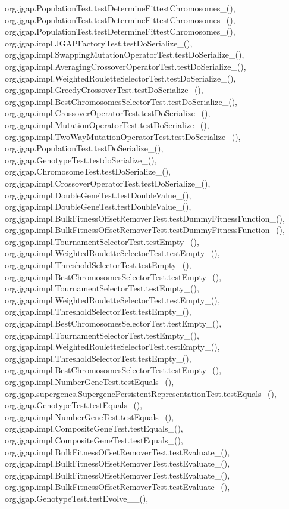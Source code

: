 org.\-jgap.\-Population\-Test.\-test\-Determine\-Fittest\-Chromosomes\-\_(), org.\-jgap.\-Population\-Test.\-test\-Determine\-Fittest\-Chromosomes\-\_(), org.\-jgap.\-Population\-Test.\-test\-Determine\-Fittest\-Chromosomes\-\_(), org.\-jgap.\-impl.\-J\-G\-A\-P\-Factory\-Test.\-test\-Do\-Serialize\-\_(), org.\-jgap.\-impl.\-Swapping\-Mutation\-Operator\-Test.\-test\-Do\-Serialize\-\_(), org.\-jgap.\-impl.\-Averaging\-Crossover\-Operator\-Test.\-test\-Do\-Serialize\-\_(), org.\-jgap.\-impl.\-Weighted\-Roulette\-Selector\-Test.\-test\-Do\-Serialize\-\_(), org.\-jgap.\-impl.\-Greedy\-Crossover\-Test.\-test\-Do\-Serialize\-\_(), org.\-jgap.\-impl.\-Best\-Chromosomes\-Selector\-Test.\-test\-Do\-Serialize\-\_(), org.\-jgap.\-impl.\-Crossover\-Operator\-Test.\-test\-Do\-Serialize\-\_(), org.\-jgap.\-impl.\-Mutation\-Operator\-Test.\-test\-Do\-Serialize\-\_(), org.\-jgap.\-impl.\-Two\-Way\-Mutation\-Operator\-Test.\-test\-Do\-Serialize\-\_(), org.\-jgap.\-Population\-Test.\-test\-Do\-Serialize\-\_(), org.\-jgap.\-Genotype\-Test.\-testdo\-Serialize\-\_(), org.\-jgap.\-Chromosome\-Test.\-test\-Do\-Serialize\-\_(), org.\-jgap.\-impl.\-Crossover\-Operator\-Test.\-test\-Do\-Serialize\-\_(), org.\-jgap.\-impl.\-Double\-Gene\-Test.\-test\-Double\-Value\-\_(), org.\-jgap.\-impl.\-Double\-Gene\-Test.\-test\-Double\-Value\-\_(), org.\-jgap.\-impl.\-Bulk\-Fitness\-Offset\-Remover\-Test.\-test\-Dummy\-Fitness\-Function\-\_(), org.\-jgap.\-impl.\-Bulk\-Fitness\-Offset\-Remover\-Test.\-test\-Dummy\-Fitness\-Function\-\_(), org.\-jgap.\-impl.\-Tournament\-Selector\-Test.\-test\-Empty\-\_(), org.\-jgap.\-impl.\-Weighted\-Roulette\-Selector\-Test.\-test\-Empty\-\_(), org.\-jgap.\-impl.\-Threshold\-Selector\-Test.\-test\-Empty\-\_(), org.\-jgap.\-impl.\-Best\-Chromosomes\-Selector\-Test.\-test\-Empty\-\_(), org.\-jgap.\-impl.\-Tournament\-Selector\-Test.\-test\-Empty\-\_(), org.\-jgap.\-impl.\-Weighted\-Roulette\-Selector\-Test.\-test\-Empty\-\_(), org.\-jgap.\-impl.\-Threshold\-Selector\-Test.\-test\-Empty\-\_(), org.\-jgap.\-impl.\-Best\-Chromosomes\-Selector\-Test.\-test\-Empty\-\_(), org.\-jgap.\-impl.\-Tournament\-Selector\-Test.\-test\-Empty\-\_(), org.\-jgap.\-impl.\-Weighted\-Roulette\-Selector\-Test.\-test\-Empty\-\_(), org.\-jgap.\-impl.\-Threshold\-Selector\-Test.\-test\-Empty\-\_(), org.\-jgap.\-impl.\-Best\-Chromosomes\-Selector\-Test.\-test\-Empty\-\_(), org.\-jgap.\-impl.\-Number\-Gene\-Test.\-test\-Equals\-\_(), org.\-jgap.\-supergenes.\-Supergene\-Persistent\-Representation\-Test.\-test\-Equals\-\_(), org.\-jgap.\-Genotype\-Test.\-test\-Equals\-\_(), org.\-jgap.\-impl.\-Number\-Gene\-Test.\-test\-Equals\-\_(), org.\-jgap.\-impl.\-Composite\-Gene\-Test.\-test\-Equals\-\_(), org.\-jgap.\-impl.\-Composite\-Gene\-Test.\-test\-Equals\-\_(), org.\-jgap.\-impl.\-Bulk\-Fitness\-Offset\-Remover\-Test.\-test\-Evaluate\-\_(), org.\-jgap.\-impl.\-Bulk\-Fitness\-Offset\-Remover\-Test.\-test\-Evaluate\-\_(), org.\-jgap.\-impl.\-Bulk\-Fitness\-Offset\-Remover\-Test.\-test\-Evaluate\-\_(), org.\-jgap.\-impl.\-Bulk\-Fitness\-Offset\-Remover\-Test.\-test\-Evaluate\-\_(), org.\-jgap.\-Genotype\-Test.\-test\-Evolve\-\_\-\_(), 